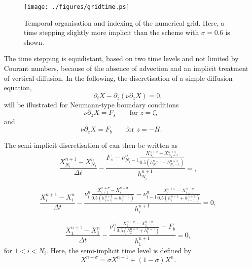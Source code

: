 \begin{figure}
\begin{center}
\texttt{[image: ./figures/gridtime.ps]}
\caption{Temporal organisation and indexing of the numerical grid.
Here, a time stepping slightly more implicit than the 
\cite{CrankNicolson47}
scheme with $\sigma=0.6$ is shown.
}\label{FigGridTime}
\end{center}
\end{figure}

The time stepping is equidistant, based on two time levels and not
limited by Courant numbers, because of the absence of advection and an
implicit treatment of vertical diffusion.  In the following, the
discretisation of a simple diffusion equation,
\begin{equation}
  \label{simpleDiffusion}
  \partial_t X - \partial_z(\nu \partial_z X)=0
  \comma
\end{equation}
will be illustrated for Neumann-type
boundary conditions
\begin{equation}
  \nu \partial_z X = F_s
  \qquad \mbox{for } z=\zeta,\qquad
\end{equation}
and
\begin{equation}
  \nu \partial_z X = F_b
  \qquad \mbox{for } z=-H.\qquad
\end{equation}

The semi-implicit discretisation of 
can then be written as
 \begin{equation}\label{sigmafirst}
 \displaystyle
 \frac{X^{n+1}_{N_i}-X^n_{N_i}}{\Delta t}
 -\frac{F_s
 -\nu^n_{N_i-1}\frac{X^{n+\sigma}_{N_i}-X^{n+\sigma}_{N_i-1}}{0.5(h^{n+1}_{N_i}+h^{n+1}_{N_i-1})}}{h^{n
 +1}_{N_i}}
 =
  \comma
 \end{equation}

\begin{equation}\label{Xdiscrete}
\displaystyle
\frac{X^{n+1}_i-X^n_i}{\Delta t}
-\frac{\nu^n_i\frac{X^{n+\sigma}_{i+1}-X^{n+\sigma}_{i}}{0.5(h^{n+1}_{i+1}+h^{n+1}_i)}
-\nu^n_{i-1}\frac{X^{n+\sigma}_{i}-X^{n+\sigma}_{i-1}}{0.5(h^{n+1}_i+h^{n+1}_{i-1})}}{h^{n
+1}_i}
=0
\comma
\end{equation}

\begin{equation}\label{sigmalast}
\displaystyle
\frac{X^{n+1}_1-X^n_1}{\Delta t}
-\frac{\nu^n_1\frac{X^{n+\sigma}_{2}-X^{n+\sigma}_{1}}{0.5(h^{n+1}_{2}+h^{n+1}_1)}
-F_b}{h^{n+1}_1}
=0
\comma
\end{equation}
for $1<i<N_i$. Here, the semi-implicit time level is defined by
\begin{equation}
  X^{n+\sigma}=\sigma X^{n+1}+(1-\sigma)X^n.
\end{equation}


